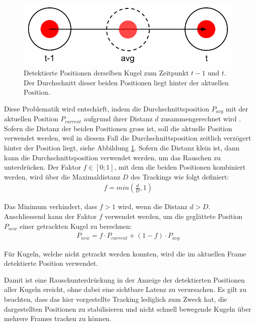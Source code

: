 \begin{figure}[h!]
    \begin{center}
        \includegraphics[width=0.6\linewidth]{../common/03_billiard_ai/resources/tracking_moving_average_for_moving_balls.png}
    \end{center}
    \caption{Detektierte Positionen derselben Kugel zum Zeitpunkt $t-1$ und $t$. Der Durchschnitt dieser beiden Positionen liegt hinter der aktuellen Position.}
    \label{fig:tracking_moving_average_for_moving_balls}
\end{figure}

Diese Problematik wird entschärft, indem die Durchschnittsposition $P_{avg}$ mit der aktuellen Position $P_{current}$
aufgrund ihrer Distanz $d$ zusammengerechnet wird \cite{learnopencv:stabilizing_landmarks_in_videos}.
Sofern die Distanz der beiden Positionen gross ist, soll die aktuelle Position verwendet werden, weil in diesem Fall
die Durchschnittsposition zeitlich verzögert hinter der Position liegt, siehe Abbildung \ref{fig:tracking_moving_average_for_moving_balls}.
Sofern die Distanz klein ist, dann kann die Durchschnittsposition verwendet werden, um das Rauschen zu unterdrücken.
Der Faktor $f \in [0; 1]$, mit dem die beiden Positionen kombiniert werden, wird über die Maximaldistanz $D$ des Trackings wie folgt definiert:
\begin{align}
    f = min(\frac{d}{D}, 1)
\end{align}

Das Minimum verhindert, dass $f > 1$ wird, wenn die Distanz $d > D$.
Anschliessend kann der Faktor $f$ verwendet werden, um die geglättete Position $P_{new}$ einer getrackten Kugel zu berechnen:
\begin{align}
    P_{new} = f \cdot P_{current} + (1 - f) \cdot P_{avg}
\end{align}

Für Kugeln, welche nicht getrackt werden konnten, wird die im aktuellen Frame detektierte Position verwendet.

Damit ist eine Rauschunterdrückung in der Anzeige der detektierten Positionen aller Kugeln ereicht, ohne dabei eine
sichtbare Latenz zu verursachen.
Es gilt zu beachten, dass das hier vorgestellte Tracking lediglich zum Zweck hat, die dargestellten Positionen zu stabilisieren
und nicht schnell bewegende Kugeln über mehrere Frames tracken zu können.

